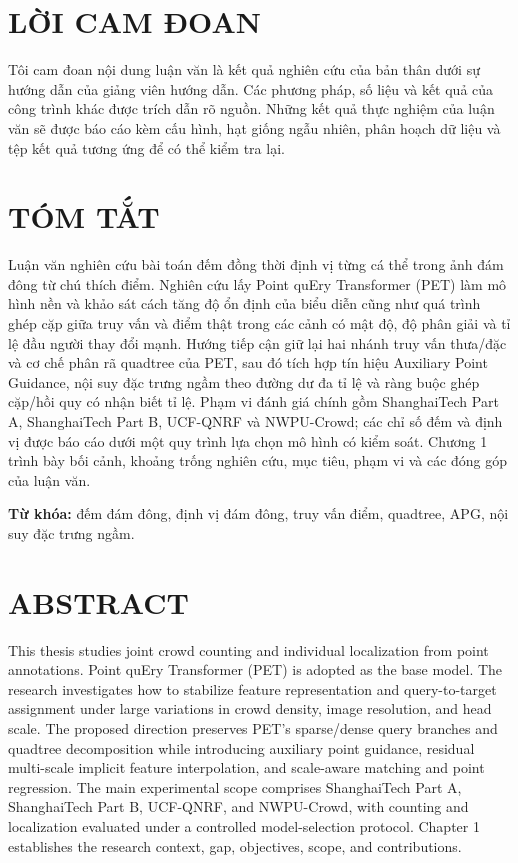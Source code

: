 \documentclass[oneside,a4paper,12pt]{extreport}
\begin{document}


\setcounter{page}{1}

\chapter*{LỜI CAM ĐOAN}
Tôi cam đoan nội dung luận văn là kết quả nghiên cứu của bản thân dưới sự hướng dẫn của giảng viên hướng dẫn. Các phương pháp, số liệu và kết quả của công trình khác được trích dẫn rõ nguồn. Những kết quả thực nghiệm của luận văn sẽ được báo cáo kèm cấu hình, hạt giống ngẫu nhiên, phân hoạch dữ liệu và tệp kết quả tương ứng để có thể kiểm tra lại.



\chapter*{TÓM TẮT}
Luận văn nghiên cứu bài toán đếm đồng thời định vị từng cá thể trong ảnh đám đông từ chú thích điểm. Nghiên cứu lấy Point quEry Transformer (PET) làm mô hình nền và khảo sát cách tăng độ ổn định của biểu diễn cũng như quá trình ghép cặp giữa truy vấn và điểm thật trong các cảnh có mật độ, độ phân giải và tỉ lệ đầu người thay đổi mạnh. Hướng tiếp cận giữ lại hai nhánh truy vấn thưa/đặc và cơ chế phân rã quadtree của PET, sau đó tích hợp tín hiệu Auxiliary Point Guidance, nội suy đặc trưng ngầm theo đường dư đa tỉ lệ và ràng buộc ghép cặp/hồi quy có nhận biết tỉ lệ. Phạm vi đánh giá chính gồm ShanghaiTech Part A, ShanghaiTech Part B, UCF-QNRF và NWPU-Crowd; các chỉ số đếm và định vị được báo cáo dưới một quy trình lựa chọn mô hình có kiểm soát. Chương 1 trình bày bối cảnh, khoảng trống nghiên cứu, mục tiêu, phạm vi và các đóng góp của luận văn.

\noindent\textbf{Từ khóa:} đếm đám đông, định vị đám đông, truy vấn điểm, quadtree, APG, nội suy đặc trưng ngầm.

\chapter*{ABSTRACT}
This thesis studies joint crowd counting and individual localization from point annotations. Point quEry Transformer (PET) is adopted as the base model. The research investigates how to stabilize feature representation and query-to-target assignment under large variations in crowd density, image resolution, and head scale. The proposed direction preserves PET's sparse/dense query branches and quadtree decomposition while introducing auxiliary point guidance, residual multi-scale implicit feature interpolation, and scale-aware matching and point regression. The main experimental scope comprises ShanghaiTech Part A, ShanghaiTech Part B, UCF-QNRF, and NWPU-Crowd, with counting and localization evaluated under a controlled model-selection protocol. Chapter 1 establishes the research context, gap, objectives, scope, and contributions.
\end{document}
